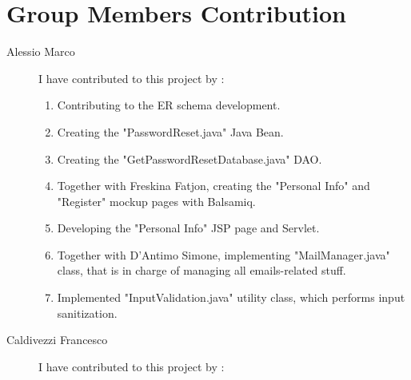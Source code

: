 \section{Group Members Contribution}


\begin{description}
	\item[Alessio Marco] I have contributed to this project by :
	\begin{enumerate}
		\item Contributing to the ER schema development.
		\item Creating the "PasswordReset.java" Java Bean.
		\item Creating the "GetPasswordResetDatabase.java" DAO.
		\item Together with Freskina Fatjon, creating the "Personal Info" and "Register" mockup pages with Balsamiq.
		\item Developing the "Personal Info" JSP page and Servlet.
		\item Together with D'Antimo Simone, implementing "MailManager.java" class, that is in charge of managing all emails-related stuff.
		\item Implemented "InputValidation.java" utility class, which performs input sanitization.
	\end{enumerate}
	\item[Caldivezzi Francesco] I have contributed to this project by :
	

\end{description}

